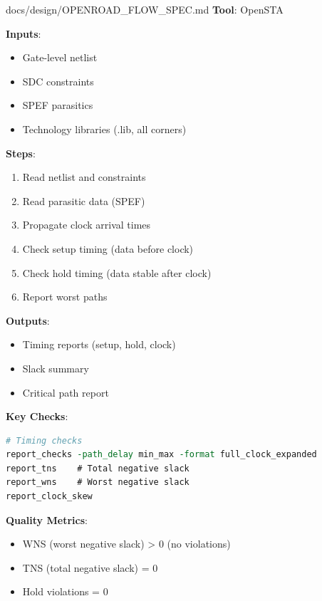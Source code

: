 \begin{relocated}{docs/design/OPENROAD_FLOW_SPEC.md}
\textbf{Tool}: OpenSTA

\textbf{Inputs}:

\begin{itemize}
\tightlist
\item
  Gate-level netlist
\item
  SDC constraints
\item
  SPEF parasitics
\item
  Technology libraries (.lib, all corners)
\end{itemize}

\textbf{Steps}:

\begin{enumerate}
\def\labelenumi{\arabic{enumi}.}
\tightlist
\item
  Read netlist and constraints
\item
  Read parasitic data (SPEF)
\item
  Propagate clock arrival times
\item
  Check setup timing (data before clock)
\item
  Check hold timing (data stable after clock)
\item
  Report worst paths
\end{enumerate}

\textbf{Outputs}:

\begin{itemize}
\tightlist
\item
  Timing reports (setup, hold, clock)
\item
  Slack summary
\item
  Critical path report
\end{itemize}

\textbf{Key Checks}:

\begin{lstlisting}[language=tcl]
# Timing checks
report_checks -path_delay min_max -format full_clock_expanded
report_tns    # Total negative slack
report_wns    # Worst negative slack
report_clock_skew
\end{lstlisting}

\textbf{Quality Metrics}:

\begin{itemize}
\tightlist
\item
  WNS (worst negative slack) \textgreater{} 0 (no violations)
\item
  TNS (total negative slack) = 0
\item
  Hold violations = 0
\end{itemize}


\end{relocated}
